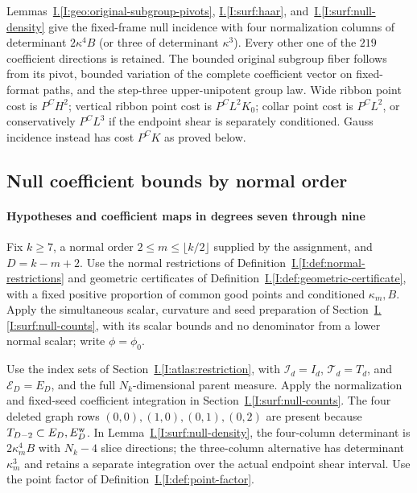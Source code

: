 \documentclass[11pt]{amsart}
\theoremstyle{definition}
\theoremstyle{remark}
\numberwithin{equation}{section}
\newcommand{\partIref}[1]{\hyperref[I:#1]{I.\ref*{I:#1}}}
\begin{document}
Lemmas~\partIref{geo:original-subgroup-pivots}, \partIref{surf:haar}, and~\partIref{surf:null-density} give the fixed-frame null incidence with four normalization columns of determinant $2\kappa^4B$ (or three of determinant $\kappa^3$). Every other one of the $219$ coefficient directions is retained. The bounded original subgroup fiber follows from its pivot, bounded variation of the complete coefficient vector on fixed-format paths, and the step-three upper-unipotent group law. Wide ribbon point cost is $P^CH^2$; vertical ribbon point cost is $P^CL^2K_0$; collar point cost is $P^CL^2$, or conservatively $P^CL^3$ if the endpoint shear is separately conditioned. Gauss incidence instead has cost $P^CK$ as proved below.

\subsection{Null coefficient bounds by normal order}\label{surf:finite-null-counts}\label{low:78:s37i:section}\label{low:78:s38o:section}\label{low:78:s38i:section}\label{low:78:d8q:section}\label{low:9:u9:formulas}\label{low:9:h9d:section}\label{low:9:u9:collar}

\paragraph{Hypotheses and coefficient maps in degrees seven through nine}

Fix $k\ge7$, a normal order $2\le m\le\lfloor k/2\rfloor$ supplied by the assignment, and $D=k-m+2$. Use the normal restrictions of Definition~\partIref{def:normal-restrictions} and geometric certificates of Definition~\partIref{def:geometric-certificate}, with a fixed positive proportion of common good points and conditioned $\kappa_m,B$. Apply the simultaneous scalar, curvature and seed preparation of Section~\partIref{surf:null-counts}, with its scalar bounds and no denominator from a lower normal scalar; write $\phi=\phi_0$.

Use the index sets of Section~\partIref{atlas:restriction}, with $\mathcal I_d=I_d$, $\mathcal T_d=T_d$, and $\mathcal E_D=E_D$, and the full $N_k$-dimensional parent measure. Apply the normalization and fixed-seed coefficient integration in Section~\partIref{surf:null-counts}. The four deleted graph rows $(0,0),(1,0),(0,1),(0,2)$ are present because $T_{D-2}\subset E_D,E_D^{\rm w}$. In Lemma~\partIref{surf:null-density}, the four-column determinant is $2\kappa_m^4B$ with $N_k-4$ slice directions; the three-column alternative has determinant $\kappa_m^3$ and retains a separate integration over the actual endpoint shear interval. Use the point factor of Definition~\partIref{def:point-factor}.
\end{document}
